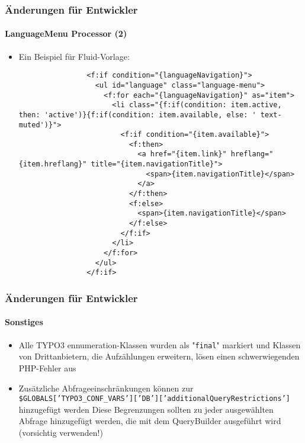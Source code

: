 \begin{frame}[fragile]
	\frametitle{Änderungen für Entwickler}
	\framesubtitle{LanguageMenu Processor (2)}

	\lstset{basicstyle=\tiny\ttfamily}

	\begin{itemize}
		\item Ein Beispiel für Fluid-Vorlage:

			\begin{lstlisting}
				<f:if condition="{languageNavigation}">
				  <ul id="language" class="language-menu">
				    <f:for each="{languageNavigation}" as="item">
				      <li class="{f:if(condition: item.active, then: 'active')}{f:if(condition: item.available, else: ' text-muted')}">
				        <f:if condition="{item.available}">
				          <f:then>
				            <a href="{item.link}" hreflang="{item.hreflang}" title="{item.navigationTitle}">
				              <span>{item.navigationTitle}</span>
				            </a>
				          </f:then>
				          <f:else>
				            <span>{item.navigationTitle}</span>
				          </f:else>
				        </f:if>
				      </li>
				    </f:for>
				  </ul>
				</f:if>
			\end{lstlisting}

	\end{itemize}

\end{frame}


\begin{frame}[fragile]
	\frametitle{Änderungen für Entwickler}
	\framesubtitle{Sonstiges}

	\begin{itemize}
		\item Alle TYPO3 ennumeration-Klassen wurden als "\texttt{final}" markiert und Klassen
			 von Drittanbietern, die Aufzählungen erweitern, lösen einen schwerwiegenden PHP-Fehler aus
		\item Zusätzliche Abfrageeinschränkungen können zur \newline
			\smaller
				\texttt{\$GLOBALS['TYPO3\_CONF\_VARS']['DB']['additionalQueryRestrictions']} 
			\normalsize hinzugefügt werden \newline
			Diese Begrenzungen sollten zu jeder ausgewählten Abfrage hinzugefügt werden, die 
			mit dem QueryBuilder ausgeführt wird (vorsichtig verwenden!)

	\end{itemize}

\end{frame}

